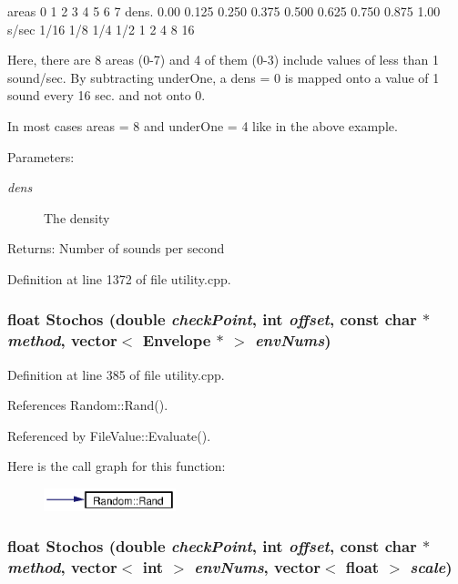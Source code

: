 areas 0 1 2 3 4 5 6 7 dens. 0.00 0.125 0.250 0.375 0.500 0.625 0.750 0.875 1.00 s/sec 1/16 1/8 1/4 1/2 1 2 4 8 16

Here, there are 8 areas (0-7) and 4 of them (0-3) include values of less than 1 sound/sec. By subtracting under\-One, a dens = 0 is mapped onto a value of 1 sound every 16 sec. and not onto 0.

In most cases areas = 8 and under\-One = 4 like in the above example. \begin{Desc}
\item[Parameters:]
\begin{description}
\item[{\em dens}]The density \end{description}
\end{Desc}
\begin{Desc}
\item[Returns:]Number of sounds per second \end{Desc}


Definition at line 1372 of file utility.cpp.
\subsubsection{\setlength{\rightskip}{0pt plus 5cm}float Stochos (double {\em check\-Point}, int {\em offset}, const char $\ast$ {\em method}, vector$<$ Envelope $\ast$ $>$ {\em env\-Nums})}\label{utility_8h_a12}




Definition at line 385 of file utility.cpp.

References Random::Rand().

Referenced by File\-Value::Evaluate().

Here is the call graph for this function:\begin{figure}[H]
\begin{center}
\leavevmode
\includegraphics[width=109pt]{utility_8h_a12_cgraph}
\end{center}
\end{figure}
\subsubsection{\setlength{\rightskip}{0pt plus 5cm}float Stochos (double {\em check\-Point}, int {\em offset}, const char $\ast$ {\em method}, vector$<$ int $>$ {\em env\-Nums}, vector$<$ float $>$ {\em scale})}\label{utility_8h_a11}


